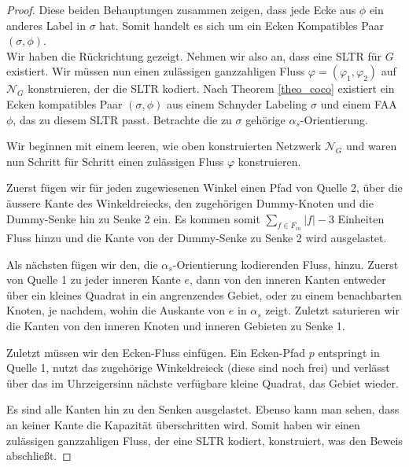 \begin{proof}
Diese beiden Behauptungen zusammen zeigen, dass jede Ecke aus $\phi$ ein anderes Label in $\sigma$ hat. Somit handelt es sich um ein Ecken Kompatibles Paar $(\sigma,\phi)$.\\

Wir haben die Rückrichtung gezeigt. Nehmen wir also an, dass eine SLTR für $G$ existiert. Wir müssen nun einen zulässigen ganzzahligen Fluss $\varphi=(\varphi_1,\varphi_2)$ auf $\mathcal{N}_G$ konstruieren, der die SLTR kodiert. Nach Theorem \ref{theo_coco} existiert ein Ecken kompatibles Paar $(\sigma,\phi)$ aus einem Schnyder Labeling $\sigma$ und einem FAA $\phi$, das zu diesem SLTR passt. Betrachte die zu $\sigma$ gehörige $\alpha_s$-Orientierung.

Wir beginnen mit einem leeren, wie oben konstruierten Netzwerk $\mathcal{N}_G$ und waren nun Schritt für Schritt einen zulässigen Fluss $\varphi$ konstruieren.

Zuerst fügen wir für jeden zugewiesenen Winkel einen Pfad von Quelle 2, über die äussere Kante des Winkeldreiecks, den zugehörigen Dummy-Knoten und die Dummy-Senke hin zu Senke 2 ein. Es kommen somit $\sum_{f \in F_{in}}|f|-3$ Einheiten Fluss hinzu und die Kante von der Dummy-Senke zu Senke 2 wird ausgelastet.

Als nächsten fügen wir den, die $\alpha_s$-Orientierung kodierenden Fluss, hinzu. Zuerst von Quelle 1 zu jeder inneren Kante $e$, dann von den inneren Kanten entweder über ein kleines Quadrat in ein angrenzendes Gebiet, oder zu einem benachbarten Knoten, je nachdem, wohin die Auskante von $e$ in $\alpha_s$ zeigt. Zuletzt saturieren wir die Kanten von den inneren Knoten und inneren Gebieten zu Senke 1.

Zuletzt müssen wir den Ecken-Fluss einfügen. Ein Ecken-Pfad $p$ entspringt in Quelle 1, nutzt das zugehörige Winkeldreieck (diese sind noch frei) und verlässt über das im Uhrzeigersinn nächste verfügbare kleine Quadrat, das Gebiet wieder. 

Es sind alle Kanten hin zu den Senken ausgelastet. Ebenso kann man sehen, dass an keiner Kante die Kapazität überschritten wird. Somit haben wir einen zulässigen ganzzahligen Fluss, der eine SLTR kodiert, konstruiert, was den Beweis abschließt.

\end{proof}

